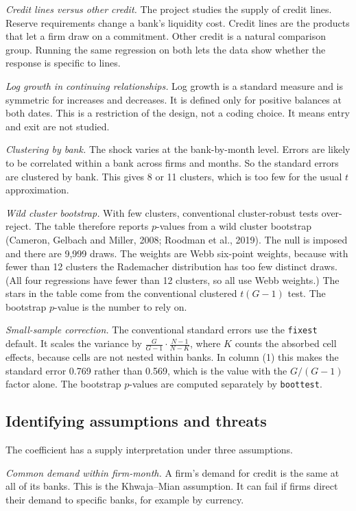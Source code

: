 \documentclass[11pt]{article}
\newcommand{\code}[1]{\texttt{#1}}
\renewcommand{\_}{\origunderscore\hspace{0pt}}  %
\begin{document}
\textit{Credit lines versus other credit.}
The project studies the supply of credit lines.
Reserve requirements change a bank's liquidity cost.
Credit lines are the products that let a firm draw on a commitment.
Other credit is a natural comparison group.
Running the same regression on both lets the data show whether the response is specific to lines.

\textit{Log growth in continuing relationships.}
Log growth is a standard measure and is symmetric for increases and decreases.
It is defined only for positive balances at both dates.
This is a restriction of the design, not a coding choice.
It means entry and exit are not studied.

\textit{Clustering by bank.}
The shock varies at the bank-by-month level.
Errors are likely to be correlated within a bank across firms and months.
So the standard errors are clustered by bank.
This gives 8 or 11 clusters, which is too few for the usual $t$ approximation.

\textit{Wild cluster bootstrap.}
With few clusters, conventional cluster-robust tests over-reject.
The table therefore reports $p$-values from a wild cluster bootstrap (Cameron, Gelbach and Miller, 2008; Roodman et al., 2019).
The null is imposed and there are 9,999 draws.
The weights are Webb six-point weights, because with fewer than 12 clusters the Rademacher distribution has too few distinct draws.
(All four regressions have fewer than 12 clusters, so all use Webb weights.)
The stars in the table come from the conventional clustered $t(G-1)$ test.
The bootstrap $p$-value is the number to rely on.

\textit{Small-sample correction.}
The conventional standard errors use the \code{fixest} default.
It scales the variance by $\tfrac{G}{G-1}\cdot\tfrac{N-1}{N-K}$, where $K$ counts the absorbed cell effects, because cells are not nested within banks.
In column (1) this makes the standard error 0.769 rather than 0.569, which is the value with the $G/(G-1)$ factor alone.
The bootstrap $p$-values are computed separately by \code{boottest}.

\subsection{Identifying assumptions and threats}

The coefficient has a supply interpretation under three assumptions.

\textit{Common demand within firm-month.}
A firm's demand for credit is the same at all of its banks.
This is the Khwaja--Mian assumption.
It can fail if firms direct their demand to specific banks, for example by currency.
\end{document}
